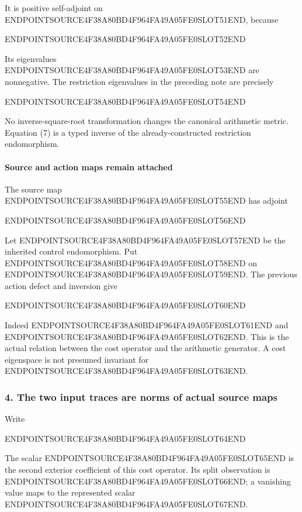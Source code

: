 It is positive self-adjoint on ENDPOINTSOURCE4F38A80BD4F964FA49A05FE0SLOT51END, because

ENDPOINTSOURCE4F38A80BD4F964FA49A05FE0SLOT52END

Its eigenvalues ENDPOINTSOURCE4F38A80BD4F964FA49A05FE0SLOT53END are nonnegative. The restriction eigenvalues in the preceding note are precisely

ENDPOINTSOURCE4F38A80BD4F964FA49A05FE0SLOT54END

No inverse-square-root transformation changes the canonical arithmetic metric. Equation (7) is a typed inverse of the already-constructed restriction endomorphism.

\paragraph{Source and action maps remain attached}\label{endpoint-relation_moment_original--source-and-action-maps-remain-attached}

The source map ENDPOINTSOURCE4F38A80BD4F964FA49A05FE0SLOT55END has adjoint

ENDPOINTSOURCE4F38A80BD4F964FA49A05FE0SLOT56END

Let ENDPOINTSOURCE4F38A80BD4F964FA49A05FE0SLOT57END be the inherited control endomorphism. Put ENDPOINTSOURCE4F38A80BD4F964FA49A05FE0SLOT58END on ENDPOINTSOURCE4F38A80BD4F964FA49A05FE0SLOT59END. The previous action defect and inversion give

ENDPOINTSOURCE4F38A80BD4F964FA49A05FE0SLOT60END

Indeed ENDPOINTSOURCE4F38A80BD4F964FA49A05FE0SLOT61END and ENDPOINTSOURCE4F38A80BD4F964FA49A05FE0SLOT62END. This is the actual relation between the cost operator and the arithmetic generator. A cost eigenspace is not presumed invariant for ENDPOINTSOURCE4F38A80BD4F964FA49A05FE0SLOT63END.

\subsubsection{4. The two input traces are norms of actual source maps}\label{endpoint-relation_moment_original--the-two-input-traces-are-norms-of-actual-source-maps}

Write

ENDPOINTSOURCE4F38A80BD4F964FA49A05FE0SLOT64END

The scalar ENDPOINTSOURCE4F38A80BD4F964FA49A05FE0SLOT65END is the second exterior coefficient of this cost operator. Its split observation is ENDPOINTSOURCE4F38A80BD4F964FA49A05FE0SLOT66END; a vanishing value maps to the represented scalar ENDPOINTSOURCE4F38A80BD4F964FA49A05FE0SLOT67END.

